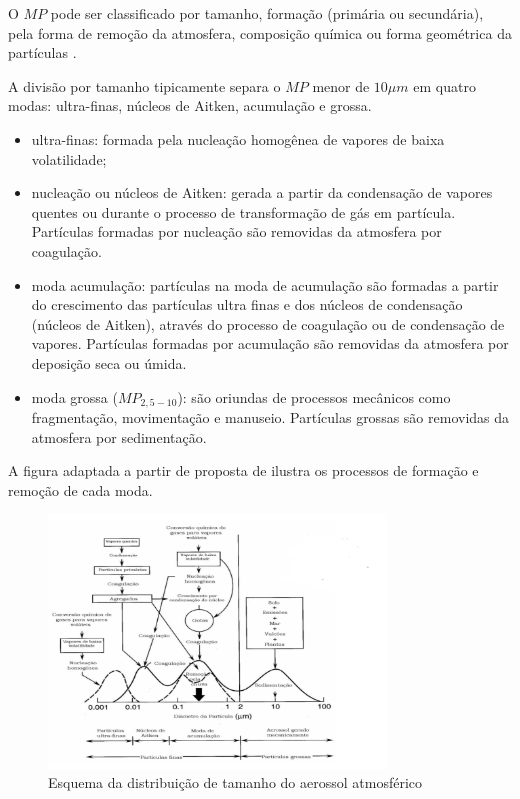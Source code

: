 O $MP$ pode ser classificado por tamanho, formação 
(primária ou secundária), pela forma de remoção da atmosfera, 
composição química ou forma geométrica da partículas \citep{seinfeld2012}.%

A divisão por tamanho tipicamente separa o $MP$ menor de 
$10 \mu m$ em quatro modas:
ultra-finas, núcleos de Aitken, acumulação e grossa. 

\begin{itemize}
  \item ultra-finas: formada pela nucleação homogênea de vapores de baixa volatilidade;
  \item nucleação ou núcleos de Aitken: 
        gerada a partir da condensação de vapores quentes ou durante o processo de 
        transformação de gás em partícula. Partículas formadas por 
        nucleação são removidas da atmosfera por coagulação.   
  \item moda acumulação: 
         partículas na moda de acumulação são formadas 
         a partir do crescimento das partículas ultra finas e dos núcleos 
         de condensação (núcleos de Aitken), através do processo de 
         coagulação ou de condensação de vapores. 
         Partículas formadas por acumulação
         são removidas da atmosfera por deposição seca ou úmida.%
  \item moda grossa ($MP_{2,5-10}$):
        são oriundas de processos mecânicos como fragmentação, 
        movimentação e manuseio. Partículas grossas são removidas da atmosfera 
        por sedimentação.
\end{itemize}

A figura adaptada a partir de proposta de \citep{finlayson1999} ilustra os processos de 
formação e remoção de cada moda.


\begin{figure}[H]
\begin{center}
  \includegraphics[width=0.8\textwidth]{../inputs/images/modas_aerossol.png}
  \caption{Esquema da distribuição de tamanho do aerossol atmosférico 
           \citep{finlayson1999} \label{fig:modas_aerossol}}
\end{center}
\end{figure}


